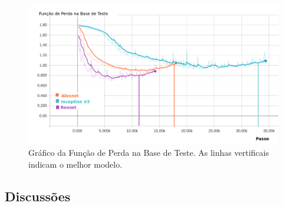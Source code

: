 \begin{figure}
\centering
\includegraphics[scale=0.5]{figuras/loss-val.png}
\caption{Gráfico da Função de Perda na Base de Teste. As linhas vertificais indicam o melhor modelo.}
\label{fig:loss-val}
\end{figure}


\subsection{Discussões}




